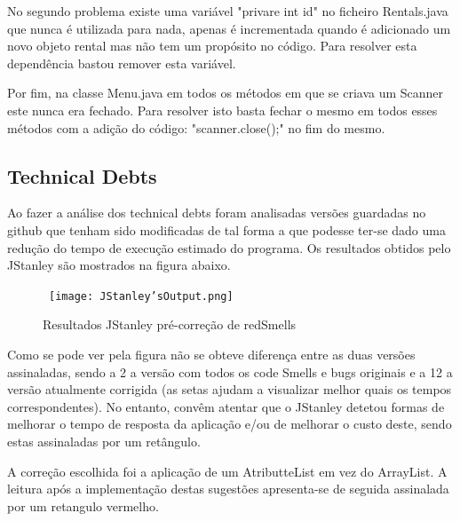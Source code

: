 \par No segundo problema existe uma variável "privare int id" no ficheiro Rentals.java que nunca é utilizada para nada, apenas é incrementada quando é adicionado um novo objeto rental mas não tem um propósito no código. Para resolver esta dependência bastou remover esta variável.\newline 

\par Por fim, na classe Menu.java em todos os métodos em que se criava um Scanner este nunca era fechado. Para resolver isto basta fechar o mesmo em todos esses métodos com a adição do código: "scanner.close();" no fim do mesmo.\newline


\subsection{Technical Debts}

Ao fazer a análise dos technical debts foram analisadas versões guardadas no github que tenham sido modificadas de tal forma a que podesse ter-se dado uma redução do tempo de execução estimado do programa. Os resultados obtidos pelo JStanley são mostrados na figura abaixo.

\begin{figure}[H]

  \centering

  \hbox{\hspace{-8em} \texttt{[image: JStanley'sOutput.png]}}

  \caption {Resultados JStanley pré-correção de redSmells}

  \label {fig28}

\end{figure}

\par Como se pode ver pela figura  não se obteve diferença entre as duas versões assinaladas, sendo a 2 a versão com todos os code Smells e bugs originais e a 12 a versão atualmente corrigida (as setas ajudam a visualizar melhor quais os tempos correspondentes). No entanto, convêm atentar que o JStanley detetou formas de melhorar o tempo de resposta da aplicação e/ou de melhorar o custo deste, sendo estas assinaladas por um retângulo. \newline


\par A correção escolhida foi a aplicação de um AtributteList em vez do ArrayList. A leitura após a implementação destas sugestões apresenta-se de seguida assinalada por um retangulo vermelho.\newline

